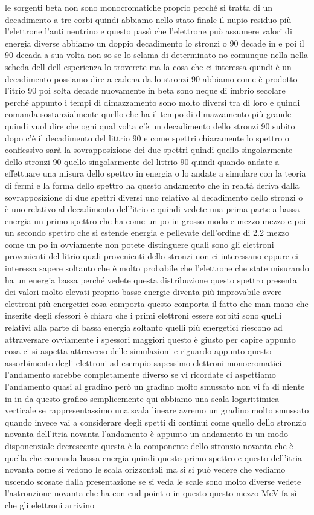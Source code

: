 le sorgenti beta non sono monocromatiche proprio perché si tratta di un decadimento a tre corbi quindi abbiamo nello stato finale il nupio residuo più l'elettrone l'anti neutrino e questo passì che l'elettrone può assumere valori di energia diverse abbiamo un doppio decadimento lo stronzi o 90 decade in e poi il 90 decada a sua volta non so se lo sclama di determinato no comunque nella nella scheda dell dell esperienza lo troverete ma la cosa che ci interessa quindi è un decadimento possiamo dire a cadena da lo stronzi 90 abbiamo come è prodotto l'itrio 90 poi solta decade nuovamente in beta sono neque di imbrio secolare perché appunto i tempi di dimazzamento sono molto diversi tra di loro e quindi comanda sostanzialmente quello che ha il tempo di dimazzamento più grande quindi vuol dire che ogni qual volta c'è un decadimento dello stronzi 90 subito dopo c'è il decadimento del littrio 90 e come spettri chiaramente lo spettro o conflessivo sarà la sovrapposizione dei due spettri quindi quello singolarmente dello stronzi 90 quello singolarmente del littrio 90 quindi quando andate a effettuare una misura dello spettro in energia o lo andate a simulare con la teoria di fermi e la forma dello spettro ha questo andamento che in realtà deriva dalla sovrapposizione di due spettri diversi uno relativo al decadimento dello stronzi o è uno relativo al decadimento dell'itrio e quindi vedete una prima parte a bassa energia un primo spettro che ha come un po in grosso modo e mezzo mezzo e poi un secondo spettro che si estende energia e pellevate dell'ordine di 2.2 mezzo come un po in ovviamente non potete distinguere quali sono gli elettroni provenienti del litrio quali provenienti dello stronzi non ci interessano eppure ci interessa sapere soltanto che è molto probabile che l'elettrone che state misurando ha un energia bassa perché vedete questa distribuzione questo spettro presenta dei valori molto elevati proprio basse energie diventa più improvabile avere elettroni più energetici cosa comporta questo comporta il fatto che man mano che inserite degli sfessori è chiaro che i primi elettroni essere sorbiti sono quelli relativi alla parte di bassa energia soltanto quelli più energetici riescono ad attraversare ovviamente i spessori maggiori questo è giusto per capire appunto cosa ci si aspetta attraverso delle simulazioni e riguardo appunto questo assorbimento degli elettroni ad esempio sapessimo elettroni monocromatici l'andamento sarebbe completamente diverso se vi ricordate ci aspettiamo l'andamento quasi al gradino però un gradino molto smussato non vi fa di niente in in da questo grafico semplicemente qui abbiamo una scala logarittimica verticale se rappresentassimo una scala lineare avremo un gradino molto smussato quando invece vai a considerare degli spetti di continui come quello dello stronzio novanta dell'itria novanta l'andamento è appunto un andamento in un modo disponenziale decrescente questa è la componente dello stronzio novanta che è quella che comanda bassa energia quindi questo primo spettro e questo dell'itria novanta come si vedono le scala orizzontali ma si si può vedere che vediamo uscendo scosate dalla presentazione se si veda le scale sono molto diverse vedete l'astronzione novanta che ha con end point o in questo questo mezzo MeV fa sì che gli elettroni arrivino 